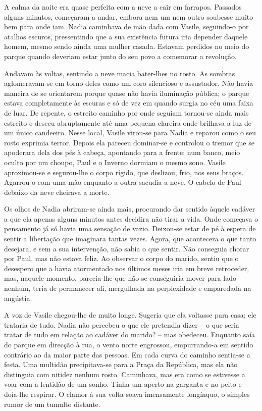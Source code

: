 A calma da noite era quase perfeita com a neve a cair em farrapos.
Passados alguns minutos, começaram a andar, embora nem um nem outro
soubesse muito bem para onde iam. Nadia caminhava de mão dada com
Vasile, seguindo-o por atalhos escuros, pressentindo que a sua
existência futura iria depender daquele homem, mesmo sendo ainda uma
mulher casada. Estavam perdidos no meio do parque quando deveriam estar
junto do seu povo a comemorar a revolução.

Andavam às voltas, sentindo a neve macia bater-lhes no rosto. As sombras
aglomeravam-se em torno deles como um coro silencioso e assustador. Não
havia maneira de se orientarem porque quase não havia iluminação
pública; o parque estava completamente às escuras e só de vez em quando
surgia no céu uma faixa de luar. De repente, o estreito caminho por onde seguiam tornou-se ainda mais estreito e desceu
abruptamente até uma pequena clareira onde brilhava a luz de um único
candeeiro. Nesse local, Vasile virou-se para Nadia e reparou como o seu
rosto exprimia terror. Depois ela pareceu dominar-se e controlou o
tremor que se apoderara dela dos pés à cabeça, apontando para a
frente: num banco, meio oculto por um choupo, Paul e o Inverno dormiam o
mesmo sono. Vasile aproximou-se e segurou-lhe o corpo rígido, que
deslizou, frio, nos seus braços. Agarrou-o com uma mão enquanto a outra
sacudia a neve. O cabelo de Paul debaixo da neve cheirava a morte.

Os olhos de Nadia abriram-se ainda mais, procurando dar sentido àquele
cadáver a que ela apenas alguns minutos antes decidira não tirar a
vida. Onde começava o pensamento já só havia uma sensação de vazio.
Deixou-se estar de pé à espera de sentir a libertação que imaginara
tantas vezes. Agora, que acontecera o que tanto desejara, e sem a sua
intervenção, não sabia o que sentir. Não conseguia chorar por Paul,
mas não estava feliz. Ao observar o corpo do marido, sentiu que o
desespero que a havia atormentado nos últimos meses iria em breve
retroceder, mas, naquele momento, parecia-lhe que não se conseguiria
mover para lado nenhum, teria de permanecer ali, mergulhada na
perplexidade e emparedada na angústia.

A voz de Vasile chegou-lhe de muito longe. Sugeria que
ela voltasse para casa; ele trataria de tudo. Nadia não percebeu o que
ele pretendia dizer -- o que seria tratar de tudo em relação ao cadáver
do marido? -- mas obedeceu. Enquanto saía do parque em direcção à rua, o
vento norte
engrossou, empurrando-a em sentido contrário ao da maior parte das
pessoas. Em cada curva do caminho sentia-se a festa. Uma multidão
precipitava-se para a Praça da República, mas ela não distinguia com
nitidez nenhum rosto. Caminhava, mas era como se estivesse a voar com a
lentidão de um sonho. Tinha um aperto na garganta e no peito e
doía-lhe respirar. O clamor à sua volta soava imensamente longínquo, o
simples rumor de um tumulto distante.

